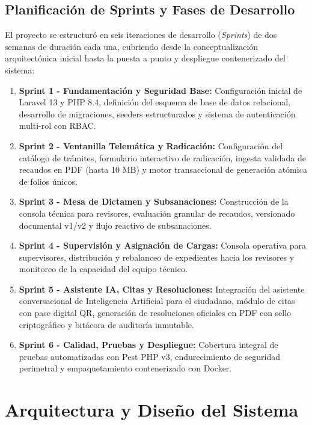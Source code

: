 \subsection{Planificación de Sprints y Fases de Desarrollo}

El proyecto se estructuró en seis iteraciones de desarrollo (\textit{Sprints}) de dos semanas de duración cada una, cubriendo desde la conceptualización arquitectónica inicial hasta la puesta a punto y despliegue contenerizado del sistema:

\begin{enumerate}
    \item \textbf{Sprint 1 - Fundamentación y Seguridad Base:} Configuración inicial de Laravel 13 y PHP 8.4, definición del esquema de base de datos relacional, desarrollo de migraciones, seeders estructurados y sistema de autenticación multi-rol con RBAC.
    \item \textbf{Sprint 2 - Ventanilla Telemática y Radicación:} Configuración del catálogo de trámites, formulario interactivo de radicación, ingesta validada de recaudos en PDF (hasta 10 MB) y motor transaccional de generación atómica de folios únicos.
    \item \textbf{Sprint 3 - Mesa de Dictamen y Subsanaciones:} Construcción de la consola técnica para revisores, evaluación granular de recaudos, versionado documental v1/v2 y flujo reactivo de subsanaciones.
    \item \textbf{Sprint 4 - Supervisión y Asignación de Cargas:} Consola operativa para supervisores, distribución y rebalanceo de expedientes hacia los revisores y monitoreo de la capacidad del equipo técnico.
    \item \textbf{Sprint 5 - Asistente IA, Citas y Resoluciones:} Integración del asistente conversacional de Inteligencia Artificial para el ciudadano, módulo de citas con pase digital QR, generación de resoluciones oficiales en PDF con sello criptográfico y bitácora de auditoría inmutable.
    \item \textbf{Sprint 6 - Calidad, Pruebas y Despliegue:} Cobertura integral de pruebas automatizadas con Pest PHP v3, endurecimiento de seguridad perimetral y empaquetamiento contenerizado con Docker.
\end{enumerate}

\section{Arquitectura y Diseño del Sistema}

